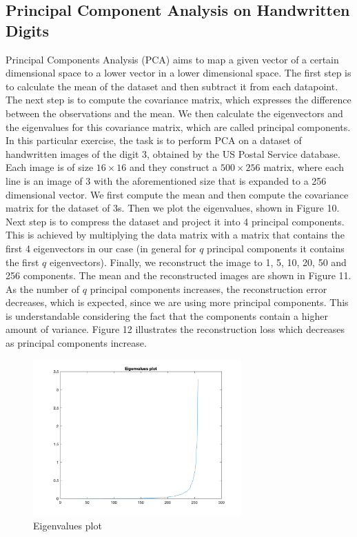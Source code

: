 \documentclass[11pt,conference,compsoc]{IEEEtran}
\begin{document}
\subsection{Principal Component Analysis on Handwritten Digits}
Principal Components Analysis (PCA) aims to map a given vector of a certain dimensional space to a lower vector in a lower dimensional space. The first step is to calculate the mean of the dataset and then subtract it from each datapoint. The next step is to compute the covariance matrix, which expresses the difference between the observations and the mean. We then calculate the eigenvectors and the eigenvalues for this covariance matrix, which are called principal components. 
In this  particular exercise, the task is to perform PCA on a dataset of handwritten images of the digit 3, obtained by the US Postal Service database. Each image is of size $16 \times 16$ and they construct a $500 \times 256$ matrix, where each line is an image of 3 with the aforementioned size that is expanded to a 256 dimensional vector. We first compute the mean and then compute the covariance matrix for the dataset of 3s. Then we plot the eigenvalues, shown in Figure 10. Next step is to compress the dataset and project it into 4 principal components. This is achieved by multiplying the data matrix with a matrix that contains the first 4 eigenvectors in our case (in general for $q$ principal components it contains the first $q$ eigenvectors). Finally, we reconstruct the image to 1, 5, 10, 20, 50 and 256 components. The mean and the reconstructed images are shown in Figure 11. 
As the number of $q$ principal components increases, the reconstruction error decreases, which is expected, since we are using more principal components. This is understandable considering the fact that the components contain a higher amount of variance. Figure 12 illustrates the reconstruction loss which decreases as principal components increase.

\begin{figure}[h]
    \centering
    \includegraphics[width=8cm]{images/eigenvalues_plot.png}
    \caption{Eigenvalues plot}
    \label{fig:10}
\end{figure}
\end{document}

